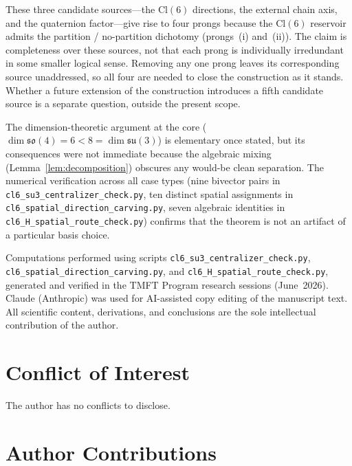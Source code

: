\documentclass[aip,jmp,amsmath,amssymb,reprint,author-year]{revtex4-2}
\begin{document}
These three candidate sources---the $\mathrm{Cl}(6)$ directions, the
external chain axis, and the quaternion factor---give rise to four prongs
because the $\mathrm{Cl}(6)$ reservoir admits the partition /
no-partition dichotomy (prongs~(i) and~(ii)).  The claim is completeness
over these sources, not that each prong is individually irredundant in
some smaller logical sense.  Removing any one prong leaves its
corresponding source unaddressed, so all four are needed to close the
construction as it stands.  Whether a future extension of the
construction introduces a fifth candidate source is a separate question,
outside the present scope.

The dimension-theoretic argument at the core
($\dim\mathfrak{so}(4) = 6 < 8 = \dim\mathfrak{su}(3)$) is elementary
once stated, but its consequences were not immediate because the
algebraic mixing (Lemma~\ref{lem:decomposition}) obscures any would-be
clean separation.  The numerical verification across all case types (nine
bivector pairs in \texttt{cl6\_su3\_centralizer\_check.py}, ten distinct
spatial assignments in \texttt{cl6\_spatial\_direction\_carving.py}, seven
algebraic identities in \texttt{cl6\_H\_spatial\_route\_check.py})
confirms that the theorem is not an artifact of a particular basis
choice.

\begin{acknowledgments}
Computations performed using scripts
\texttt{cl6\_su3\_centralizer\_check.py},
\texttt{cl6\_spatial\_direction\_\allowbreak carving.py}, and
\texttt{cl6\_H\_spatial\_route\_check.py}, generated and verified in the
TMFT Program research sessions (June~2026).  Claude (Anthropic) was used
for AI-assisted copy editing of the manuscript text.  All scientific
content, derivations, and conclusions are the sole intellectual
contribution of the author.
\end{acknowledgments}

\section*{Conflict of Interest}

The author has no conflicts to disclose.

\section*{Author Contributions}
\end{document}
